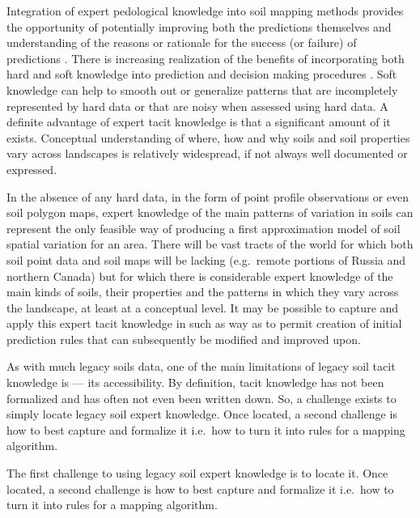 \documentclass[11pt]{krantz}
\makeatletter
\newenvironment{kframe}{%
\medskip{}
\setlength{\fboxsep}{.8em}
 \def\at@end@of@kframe{}%
 \ifinner\ifhmode%
  \def\at@end@of@kframe{\end{minipage}}%
  \begin{minipage}{\columnwidth}%
 \fi\fi%
 \def\FrameCommand##1{\hskip\@totalleftmargin \hskip-\fboxsep
 \colorbox{shadecolor}{##1}\hskip-\fboxsep
     \hskip-\linewidth \hskip-\@totalleftmargin \hskip\columnwidth}%
 \MakeFramed {\advance\hsize-\width
   \@totalleftmargin\z@ \linewidth\hsize
   \@setminipage}}%
 {\par\unskip\endMakeFramed%
 \at@end@of@kframe}
\newenvironment{rmdblock}[1]
  {
  \begin{itemize}
  \renewcommand{\labelitemi}{
    \raisebox{-.7\height}[0pt][0pt]{
      {\setkeys{Gin}{width=3em,keepaspectratio}\texttt{[image: images/\#1]}}
    }
  }
  \setlength{\fboxsep}{1em}
  \begin{kframe}
  \item
  }
  {
  \end{kframe}
  \end{itemize}
  }
\newenvironment{rmdnote}
  {\begin{rmdblock}{note}}
  {\end{rmdblock}}
\theoremstyle{definition}
\theoremstyle{definition}
\theoremstyle{definition}
\theoremstyle{remark}
\makeatother
\begin{document}
Integration of expert pedological knowledge into soil mapping methods
provides the opportunity of potentially improving both the predictions
themselves and understanding of the reasons or rationale for the success
(or failure) of predictions
\citep{Walter2006DSS, Lagacherie1995Geoderma, Lagacherie2001Geoderm}.
There is increasing realization of the benefits of incorporating both
hard and soft knowledge into prediction and decision making procedures
\citep{christakos2001temporal}. Soft knowledge can help to smooth out or
generalize patterns that are incompletely represented by hard data or
that are noisy when assessed using hard data. A definite advantage of
expert tacit knowledge is that a significant amount of it exists.
Conceptual understanding of where, how and why soils and soil properties
vary across landscapes is relatively widespread, if not always well
documented or expressed.

In the absence of any hard data, in the form of point profile
observations or even soil polygon maps, expert knowledge of the main
patterns of variation in soils can represent the only feasible way of
producing a first approximation model of soil spatial variation for an
area. There will be vast tracts of the world for which both soil point
data and soil maps will be lacking (e.g.~remote portions of Russia and
northern Canada) but for which there is considerable expert knowledge of
the main kinds of soils, their properties and the patterns in which they
vary across the landscape, at least at a conceptual level. It may be
possible to capture and apply this expert tacit knowledge in such as way
as to permit creation of initial prediction rules that can subsequently
be modified and improved upon.

As with much legacy soils data, one of the main limitations of legacy
soil tacit knowledge is --- its accessibility. By definition, tacit
knowledge has not been formalized and has often not even been written
down. So, a challenge exists to simply locate legacy soil expert
knowledge. Once located, a second challenge is how to best capture and
formalize it i.e.~how to turn it into rules for a mapping algorithm.

\begin{rmdnote}
The first challenge to using legacy soil expert knowledge is to locate
it. Once located, a second challenge is how to best capture and
formalize it i.e.~how to turn it into rules for a mapping algorithm.
\end{rmdnote}
\end{document}
